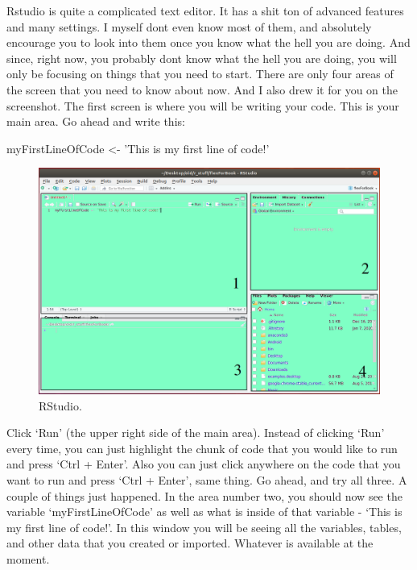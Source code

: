\documentclass[]{book}
\newenvironment{Shaded}{\begin{snugshade}}{\end{snugshade}}
\newcommand{\NormalTok}[1]{#1}
\newcommand{\StringTok}[1]{\textcolor[rgb]{0.31,0.60,0.02}{#1}}
\begin{document}
Rstudio is quite a complicated text editor. It has a shit ton of advanced features and many settings. I myself dont even know most of them, and absolutely encourage you to look into them once you know what the hell you are doing. And since, right now, you probably dont know what the hell you are doing, you will only be focusing on things that you need to start. There are only four areas of the screen that you need to know about now. And I also drew it for you on the screenshot. The first screen is where you will be writing your code. This is your main area. Go ahead and write this:

\begin{Shaded}
\begin{Highlighting}[]
\NormalTok{      myFirstLineOfCode <-}\StringTok{ 'This is my first line of code!'}
\end{Highlighting}
\end{Shaded}

\begin{figure}
\centering
\includegraphics{rstudio2.png}
\caption{RStudio.}
\end{figure}

Click `Run' (the upper right side of the main area). Instead of clicking `Run' every time, you can just highlight the chunk of code that you would like to run and press `Ctrl + Enter'. Also you can just click anywhere on the code that you want to run and press `Ctrl + Enter', same thing. Go ahead, and try all three. A couple of things just happened. In the area number two, you should now see the variable `myFirstLineOfCode' as well as what is inside of that variable - `This is my first line of code!'. In this window you will be seeing all the variables, tables, and other data that you created or imported. Whatever is available at the moment.
\end{document}
